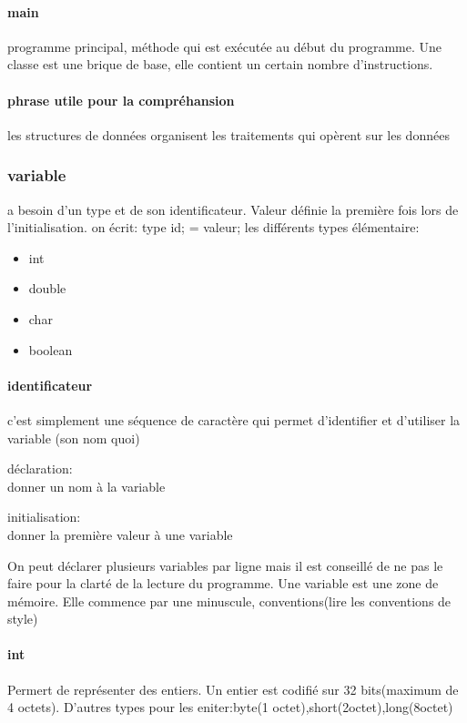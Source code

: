 \documentclass[a4paper,10pt]{article}
\begin{document}
\paragraph{main}
programme principal, méthode qui est exécutée au début du programme. Une classe est une brique de base, elle contient un certain nombre d'instructions.
\paragraph{phrase utile pour la compréhansion}
les structures de données organisent les traitements qui opèrent sur les données
\subsubsection{variable}
a besoin d'un type et de son identificateur. Valeur définie la première fois lors de l'initialisation. on écrit:
\newline
type id; = valeur;
les différents types élémentaire:

\begin{itemize}
 \item int
 \item double
 \item char
 \item boolean
\end{itemize}
\paragraph{identificateur}
c'est simplement une séquence de caractère qui permet d'identifier et d'utiliser la variable (son nom quoi)
\newline
\begin{description}
 \item déclaration:\\{donner un nom à la variable}
 \item initialisation:\\{donner la première valeur à une variable}
\end{description}

On peut déclarer plusieurs variables par ligne mais il est conseillé de ne pas le faire pour la clarté de la lecture du programme. Une variable est une zone de mémoire. Elle commence par une minuscule, conventions(lire les conventions de style)
\paragraph{int}
Permert de représenter des entiers. Un entier est codifié sur 32 bits(maximum de 4 octets). D'autres types pour les eniter:byte(1 octet),short(2octet),long(8octet)
\end{document}
